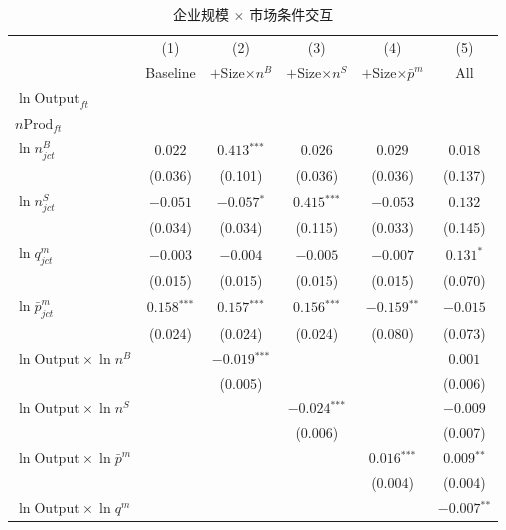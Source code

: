 \documentclass[12pt]{article}
\newcommand{\sym}[1]{\ensuremath{^{\text{#1}}}}
\newcommand{\se}[1]{{\small(#1)}}
\newcommand{\abs}{\textemdash}
\newcommand{\mis}{}
\begin{document}
\begin{landscape}
\vspace*{\fill}
\begin{table}[H]
\centering\small
\begin{threeparttable}
\caption{企业规模 $\times$ 市场条件交互}
\begin{tabular}{l *{5}{c}}
\toprule
 & (1) & (2) & (3) & (4) & (5) \\
 & Baseline
 & {$+$Size$\times n^{B}$}
 & {$+$Size$\times n^{S}$}
 & {$+$Size$\times\bar{p}^{m}$}
 & All \\
\midrule
$\ln\mathrm{Output}_{ft}$
  & \abs & \abs & \abs & \abs & \abs \\
$n\mathrm{Prod}_{ft}$
  & \abs & \abs & \abs & \abs & \abs \\[3pt]
$\ln n^{B}_{jct}$
  & $0.022$ & $0.413\sym{***}$ & $0.026$ & $0.029$ & $0.018$ \\
  & \se{0.036} & \se{0.101} & \se{0.036} & \se{0.036} & \se{0.137} \\[3pt]
$\ln n^{S}_{jct}$
  & $-0.051$ & $-0.057\sym{*}$ & $0.415\sym{***}$ & $-0.053$ & $0.132$ \\
  & \se{0.034} & \se{0.034} & \se{0.115} & \se{0.033} & \se{0.145} \\[3pt]
$\ln q^{m}_{jct}$
  & $-0.003$ & $-0.004$ & $-0.005$ & $-0.007$ & $0.131\sym{*}$ \\
  & \se{0.015} & \se{0.015} & \se{0.015} & \se{0.015} & \se{0.070} \\[3pt]
$\ln\bar{p}^{m}_{jct}$
  & $0.158\sym{***}$ & $0.157\sym{***}$ & $0.156\sym{***}$ & $-0.159\sym{**}$ & $-0.015$ \\
  & \se{0.024} & \se{0.024} & \se{0.024} & \se{0.080} & \se{0.073} \\[3pt]
$\ln\mathrm{Output}\times\ln n^{B}$
  & \mis & $-0.019\sym{***}$ & \mis & \mis & $0.001$ \\
  & & \se{0.005} & & & \se{0.006} \\[3pt]
$\ln\mathrm{Output}\times\ln n^{S}$
  & \mis & \mis & $-0.024\sym{***}$ & \mis & $-0.009$ \\
  & & & \se{0.006} & & \se{0.007} \\[3pt]
$\ln\mathrm{Output}\times\ln\bar{p}^{m}$
  & \mis & \mis & \mis & $0.016\sym{***}$ & $0.009\sym{**}$ \\
  & & & & \se{0.004} & \se{0.004} \\[3pt]
$\ln\mathrm{Output}\times\ln q^{m}$
  & \mis & \mis & \mis & \mis & $-0.007\sym{**}$ \\

\end{tabular}
\end{threeparttable}
\end{table}
\end{landscape}
\end{document}
